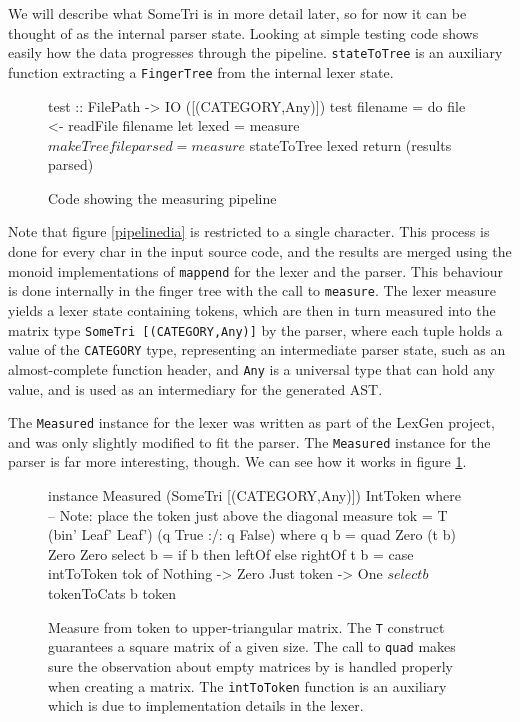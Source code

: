 \documentclass[a4paper,12pt,notitlepage]{report}
\begin{document}
We will describe what SomeTri is in more detail later, so for now it can be
thought of as the internal parser state. Looking at simple testing
code shows easily how the data progresses through the pipeline.
\texttt{stateToTree} is an auxiliary function extracting a \texttt{FingerTree}
from the internal lexer state.

\begin{figure}[H]
\begin{code}
test :: FilePath -> IO ([(CATEGORY,Any)])
test filename = do
    file <- readFile filename
    let lexed  = measure $ makeTree file
        parsed = measure $ stateToTree lexed
    return (results parsed)
\end{code} 
\caption{Code showing the measuring pipeline}
\end{figure}

Note that figure \ref{pipelinedia} is restricted to a single character. This
process is done for every char in the input source code, and the results are
merged using the monoid implementations of \texttt{mappend} for the lexer and
the parser. This behaviour is done internally in the finger tree with the call
to \texttt{measure}.  The lexer measure yields a lexer state containing tokens,
which are then in turn measured into the matrix type \texttt{SomeTri
[(CATEGORY,Any)]} by the parser, where each tuple holds a value of the
\texttt{CATEGORY} type, representing an intermediate parser state, such as an
almost-complete function header, and \texttt{Any} is a universal type that can
hold any value, and is used as an intermediary for the generated AST. 

The \texttt{Measured} instance for the lexer was written as part of the LexGen
project, and was only slightly modified to fit the parser. The \texttt{Measured}
instance for the parser is far more interesting, though. We can see how it works
in figure \ref{parsemeasure}.

\begin{figure}[H]
\begin{code}
instance Measured (SomeTri [(CATEGORY,Any)]) IntToken where
    -- Note: place the token just above the diagonal
    measure tok = T (bin' Leaf' Leaf') (q True :/: q False)
      where q b = quad Zero (t b) Zero Zero
            select b = if b then leftOf else rightOf
            t b = case intToToken tok of
                Nothing    -> Zero
                Just token -> One $ select b $ tokenToCats b token

\end{code}
\caption{\label{parsemeasure} Measure from token to upper-triangular matrix. The
\texttt{T} construct guarantees a square matrix of a given size. The call to
\texttt{quad} makes sure the observation about empty matrices by
\citet{parparsepaper} is handled properly when creating a matrix. The
\texttt{intToToken} function is an auxiliary which is due to implementation
details in the lexer.}
\end{figure}
\end{document}
